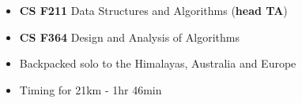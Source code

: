 %
%
%

\twocolumnsection
{
\vspace{1em}
\begin{itemize}
	\item \textbf{CS F211} Data Structures and Algorithms (\textbf{head TA})
	\item \textbf{CS F364} Design and Analysis of Algorithms
\end{itemize}
}
{
\vspace{1em}
\begin{itemize}
	\item Backpacked solo to the Himalayas, Australia and Europe
	\item Timing for 21km - 1hr 46min
\end{itemize}
}
